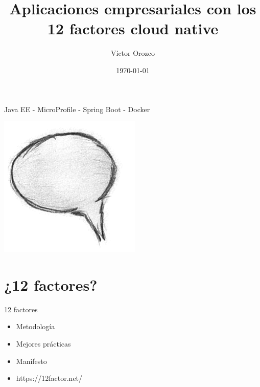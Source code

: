 \documentclass{beamer}
\title{Aplicaciones empresariales con los  12 factores cloud native}
\author{Víctor Orozco}
\institute{@tuxtor}
\date{\today}
\begin{document}
\frame{\titlepage}

\begin{frame}{Java EE - MicroProfile - Spring Boot - Docker}
\begin{center}
	\includegraphics[width=0.4\linewidth]{Images/comment}
\end{center}
\end{frame}

\section{¿12 factores?}
\begin{frame}{12 factores}
\begin{itemize}
\item Metodología
\item Mejores prácticas
\item Manifesto 
\item https://12factor.net/
\end{itemize}
\end{frame}
\end{document}
